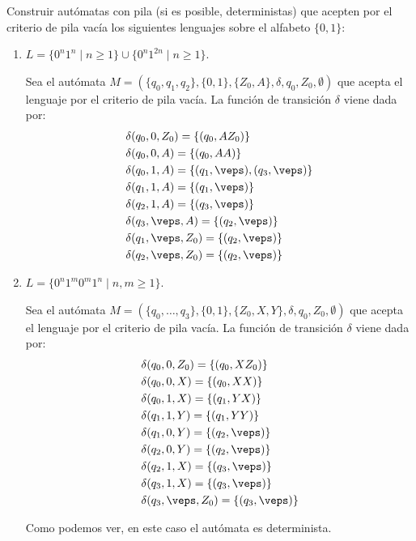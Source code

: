 \begin{ejercicio}\label{ej:1.5.18}
    Construir autómatas con pila (si es posible, deterministas) que acepten por el criterio de pila vacía los siguientes lenguajes sobre el alfabeto $\{0,1\}$:
    \begin{enumerate}
        \item $L = \{0^n 1^n \mid n\geq 1\} \cup \{0^n 1^{2n}\mid n\geq 1\}$.
        
        Sea el autómata $M = (\{q_0,q_1,q_2\},\{0,1\},\{Z_0,A\},\delta,q_0,Z_0,\emptyset)$ que acepta el lenguaje por el criterio de pila vacía. La función de transición $\delta$ viene dada por:
        \begin{align*}
            &\delta(q_0,0,Z_0) = \{(q_0,AZ_0)\} \\
            &\delta(q_0,0,A) = \{(q_0,AA)\} \\
            &\delta(q_0,1,A) = \{(q_1,\veps), (q_3,\veps)\} \\
            &\delta(q_1,1,A) = \{(q_1,\veps)\} \\
            &\delta(q_2,1,A) = \{(q_3,\veps)\} \\
            &\delta(q_3,\veps,A) = \{(q_2,\veps)\} \\
            &\delta(q_1,\veps,Z_0) = \{(q_2,\veps)\} \\
            &\delta(q_2,\veps,Z_0) = \{(q_2,\veps)\}
        \end{align*}

        \item $L = \{0^n 1^m 0^m 1^n \mid n,m\geq 1\}$.
        
        Sea el autómata $M = (\{q_0,\ldots,q_3\},\{0,1\},\{Z_0,X,Y\},\delta,q_0,Z_0,\emptyset)$ que acepta el lenguaje por el criterio de pila vacía. La función de transición $\delta$ viene dada por:
        \begin{align*}
            &\delta(q_0,0,Z_0) = \{(q_0,XZ_0)\} \\
            &\delta(q_0,0,X) = \{(q_0,XX)\} \\
            &\delta(q_0,1,X) = \{(q_1,YX)\} \\
            &\delta(q_1,1,Y) = \{(q_1,YY)\} \\
            &\delta(q_1,0,Y) = \{(q_2,\veps)\} \\
            &\delta(q_2,0,Y) = \{(q_2,\veps)\} \\
            &\delta(q_2,1,X) = \{(q_3,\veps)\} \\
            &\delta(q_3,1,X) = \{(q_3,\veps)\} \\
            &\delta(q_3,\veps,Z_0) = \{(q_3,\veps)\}
        \end{align*}

        Como podemos ver, en este caso el autómata es determinista.
    \end{enumerate}
\end{ejercicio}

